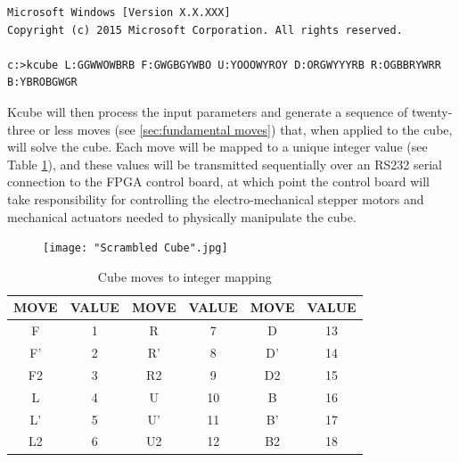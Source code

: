\documentclass[11pt,english]{article}
\begin{document}
\begin{lstlisting}[style=DOS]
Microsoft Windows [Version X.X.XXX]
Copyright (c) 2015 Microsoft Corporation. All rights reserved.

c:>kcube L:GGWWOWBRB F:GWGBGYWBO U:YOOOWYROY D:ORGWYYYRB R:OGBBRYWRR B:YBROBGWGR
\end{lstlisting}

Kcube will then process the input parameters and generate a sequence of twenty-three or less moves (see \ref{sec:fundamental moves}) that, when applied to the cube, will solve the cube. Each move will be mapped to a unique integer value (see Table \ref{table:moves table}), and these values will be transmitted sequentially over an RS232 serial connection to the FPGA control board, at which point the control board will take responsibility for controlling the electro-mechanical stepper motors and mechanical actuators needed to physically manipulate the cube.


\begin{figure}[!ht]
\centering
\texttt{[image: "Scrambled Cube".jpg]}
\caption[]{}
\label{fig:scrambled cube}
\end{figure}

\begin{table}[!ht]
\centering
\begin{tabular}{|c|c|c|c|c|c|}
\hline
\textbf{MOVE} & \textbf{VALUE} & \textbf{MOVE} & \textbf{VALUE} & \textbf{MOVE} & \textbf{VALUE} \\ \hline
F             & 1              & R             & 7              & D             & 13             \\ \hline
F'            & 2              & R'            & 8              & D'            & 14             \\ \hline
F2            & 3              & R2            & 9              & D2            & 15             \\ \hline
L             & 4              & U             & 10             & B             & 16             \\ \hline
L'            & 5              & U'            & 11             & B'            & 17             \\ \hline
L2            & 6              & U2            & 12             & B2            & 18             \\ \hline
\end{tabular}
\caption{Cube moves to integer mapping}
\label{table:moves table}
\end{table}
\end{document}
